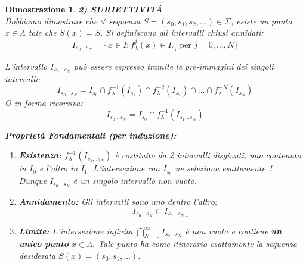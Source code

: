 \documentclass[openany]{book}
\newtheorem*{dimostrazione}{Dimostrazione}
\theoremstyle{definition}
\theoremstyle{remark}
\begin{document}
\begin{dimostrazione}
\vspace{1em}
\textbf{2) SURIETTIVITÀ} \\
Dobbiamo dimostrare che $\forall$ sequenza $S = (s_0, s_1, s_2, \dots) \in \Sigma$, esiste un punto $x \in \Lambda$ tale che $S(x) = S$.
Si definiscono gli intervalli chiusi annidati:
$$ I_{s_0 \dots s_N} = \{ x \in I : f_\lambda^j(x) \in I_{s_j} \text{ per } j=0, \dots, N \} $$

L'intervallo $I_{s_0 \dots s_N}$ può essere espresso tramite le pre-immagini dei singoli intervalli:
$$ I_{s_0 \dots s_N} = I_{s_0} \cap f_\lambda^{-1}(I_{s_1}) \cap f_\lambda^{-2}(I_{s_2}) \cap \dots \cap f_\lambda^{-N}(I_{s_N}) $$
O in forma ricorsiva:
$$ I_{s_0 \dots s_N} = I_{s_0} \cap f_\lambda^{-1}(I_{s_1 \dots s_N}) $$

\textbf{Proprietà Fondamentali (per induzione):}
\begin{enumerate}
    \item \textbf{Esistenza:} $f_\lambda^{-1}(I_{s_1 \dots s_N})$ è costituito da 2 intervalli disgiunti, uno contenuto in $I_0$ e l'altro in $I_1$. L'intersezione con $I_{s_0}$ ne seleziona \textit{esattamente 1}. Dunque $I_{s_0 \dots s_N}$ è un singolo intervallo non vuoto.
    \item \textbf{Annidamento:} Gli intervalli sono uno dentro l'altro:
    $$ I_{s_0 \dots s_N} \subset I_{s_0 \dots s_{N-1}} $$

    \item \textbf{Limite:} L'intersezione infinita $\bigcap_{N=0}^{\infty} I_{s_0 \dots s_N}$ è non vuota e contiene \textbf{un unico punto} $x \in \Lambda$. Tale punto ha come itinerario esattamente la sequenza desiderata $S(x) = (s_0, s_1, \dots)$.
\end{enumerate}


\end{dimostrazione}
\end{document}
